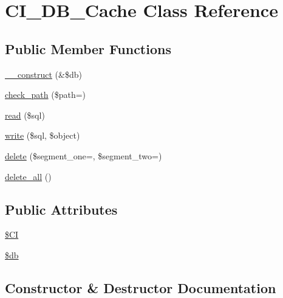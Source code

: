 \hypertarget{class_c_i___d_b___cache}{}\section{C\+I\+\_\+\+D\+B\+\_\+\+Cache Class Reference}
\label{class_c_i___d_b___cache}
\subsection*{Public Member Functions}
\begin{DoxyCompactItemize}
\item 
\mbox{\hyperlink{class_c_i___d_b___cache_aaf2ef772755ec6f361d44e16cc9ffd69}{\+\_\+\+\_\+construct}} (\&\$db)
\item 
\mbox{\hyperlink{class_c_i___d_b___cache_adb73b6f91025d00c565d228c4f611f41}{check\+\_\+path}} (\$path=\textquotesingle{}\textquotesingle{})
\item 
\mbox{\hyperlink{class_c_i___d_b___cache_a6e421e93555105d187d7e6ba4c84521b}{read}} (\$sql)
\item 
\mbox{\hyperlink{class_c_i___d_b___cache_a483ea50183465928c931aa17b4f4b5b8}{write}} (\$sql, \$object)
\item 
\mbox{\hyperlink{class_c_i___d_b___cache_ab97f36d9c24db4b2e91c9e02342cc994}{delete}} (\$segment\+\_\+one=\textquotesingle{}\textquotesingle{}, \$segment\+\_\+two=\textquotesingle{}\textquotesingle{})
\item 
\mbox{\hyperlink{class_c_i___d_b___cache_ac83c8ea1573fe325dfd87a282627fe6d}{delete\+\_\+all}} ()
\end{DoxyCompactItemize}
\subsection*{Public Attributes}
\begin{DoxyCompactItemize}
\item 
\mbox{\hyperlink{class_c_i___d_b___cache_ae0314d046ddf7fcfaec03222977427d3}{\$\+CI}}
\item 
\mbox{\hyperlink{class_c_i___d_b___cache_a1fa3127fc82f96b1436d871ef02be319}{\$db}}
\end{DoxyCompactItemize}


\subsection{Constructor \& Destructor Documentation}
\mbox{\label{class_c_i___d_b___cache_aaf2ef772755ec6f361d44e16cc9ffd69}} 
